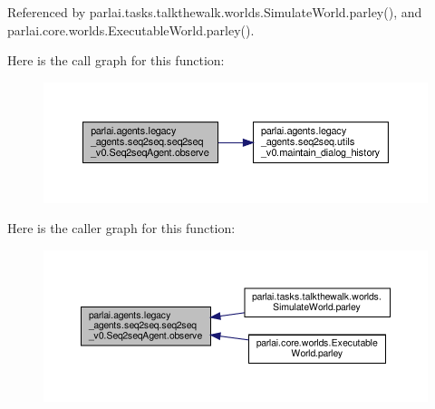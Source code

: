 Referenced by parlai.\+tasks.\+talkthewalk.\+worlds.\+Simulate\+World.\+parley(), and parlai.\+core.\+worlds.\+Executable\+World.\+parley().

Here is the call graph for this function\+:
\nopagebreak
\begin{figure}[H]
\begin{center}
\leavevmode
\includegraphics[width=350pt]{classparlai_1_1agents_1_1legacy__agents_1_1seq2seq_1_1seq2seq__v0_1_1Seq2seqAgent_a8419a9652b14a16cedff86206a7bb613_cgraph}
\end{center}
\end{figure}
Here is the caller graph for this function\+:
\nopagebreak
\begin{figure}[H]
\begin{center}
\leavevmode
\includegraphics[width=350pt]{classparlai_1_1agents_1_1legacy__agents_1_1seq2seq_1_1seq2seq__v0_1_1Seq2seqAgent_a8419a9652b14a16cedff86206a7bb613_icgraph}
\end{center}
\end{figure}
\mbox{\label{classparlai_1_1agents_1_1legacy__agents_1_1seq2seq_1_1seq2seq__v0_1_1Seq2seqAgent_ad40d38a1cc2cafe32c43477740b4a164}} 
